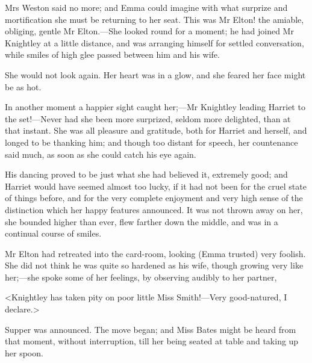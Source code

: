 Mrs Weston said no more; and Emma could imagine with what surprize and mortification she must be returning to her seat. This was Mr Elton! the amiable, obliging, gentle Mr Elton.—She looked round for a moment; he had joined Mr Knightley at a little distance, and was arranging himself for settled conversation, while smiles of high glee passed between him and his wife.

She would not look again. Her heart was in a glow, and she feared her face might be as hot.

In another moment a happier sight caught her;—Mr Knightley leading Harriet to the set!—Never had she been more surprized, seldom more delighted, than at that instant. She was all pleasure and gratitude, both for Harriet and herself, and longed to be thanking him; and though too distant for speech, her countenance said much, as soon as she could catch his eye again.

His dancing proved to be just what she had believed it, extremely good; and Harriet would have seemed almost too lucky, if it had not been for the cruel state of things before, and for the very complete enjoyment and very high sense of the distinction which her happy features announced. It was not thrown away on her, she bounded higher than ever, flew farther down the middle, and was in a continual course of smiles.

Mr Elton had retreated into the card-room, looking (Emma trusted) very foolish. She did not think he was quite so hardened as his wife, though growing very like her;—she spoke some of her feelings, by observing audibly to her partner,

<Knightley has taken pity on poor little Miss Smith!—Very good-natured, I declare.>

Supper was announced. The move began; and Miss Bates might be heard from that moment, without interruption, till her being seated at table and taking up her spoon.

